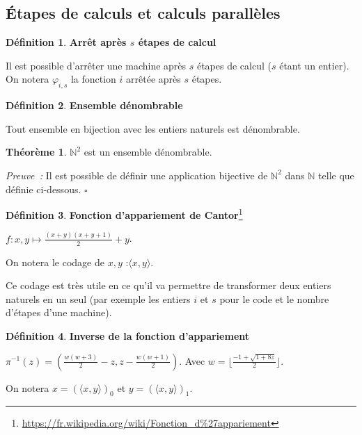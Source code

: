 \documentclass{book}
\theoremstyle{definition}
\newtheorem{theorem}{Théorème}
\newtheorem{definition}{Définition}
\numberwithin{lemma}{subsection}
\numberwithin{theorem}{subsection}
\numberwithin{definition}{subsection}
\numberwithin{proposition}{subsection}
\numberwithin{corollary}{subsection}
\numberwithin{property}{subsection}
\numberwithin{example}{subsection}
\numberwithin{heuristique}{subsection}
\numberwithin{scenario}{subsection}
\newenvironment{proofi} {\noindent\emph{Preuve~:}} {\hfill $\square$\vspace{0.2cm}}
\begin{document}
        \subsection{Étapes de calculs et calculs parallèles}
            \begin{definition}\textbf{Arrêt après $s$ étapes de calcul}
                \par Il est possible d'arrêter une machine après $s$ étapes de calcul ($s$ étant un entier). On notera $\varphi_{i,s}$ la fonction $i$ arrêtée après $s$ étapes.
            \end{definition}
            \begin{definition}\textbf{Ensemble dénombrable}
                \par Tout ensemble en bijection avec les entiers naturels est dénombrable.
            \end{definition}
            \begin{theorem}
                $\mathbb{N}^2$ est un ensemble dénombrable.
            \end{theorem}
            \begin{proofi}
                Il est possible de définir une application bijective de $\mathbb{N}^2$ dans $\mathbb{N}$ telle que définie ci-dessous.
            \end{proofi}
            \begin{definition}\textbf{Fonction d'appariement de Cantor}\footnote{\url{https://fr.wikipedia.org/wiki/Fonction\_d\%27appariement}}
                \par $f : x,y \mapsto \frac{(x+y)(x+y+1)}{2}+y$.
                \par On notera le codage de $x,y$ :$\langle x,y \rangle$.
            \end{definition}
            Ce codage est très utile en ce qu'il va permettre de transformer deux entiers naturels en un seul (par exemple les entiers $i$ et $s$ pour le code et le nombre d'étapes d'une machine).
            \begin{definition}\textbf{Inverse de la fonction d'appariement}
                \par $\pi^{-1}(z)=\left(\frac{w(w+3)}2-z,z-\frac{w(w+1)}2\right)$. Avec $w=\lfloor \frac{-1+\sqrt{1+8z}}2\rfloor$.
                \par On notera $x = (\langle x,y \rangle)_0$ et $y = (\langle x,y \rangle)_1$.
            \end{definition}
\end{document}
